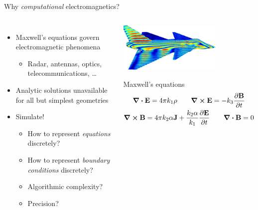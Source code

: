 \documentclass[aspectratio=169, usenames, dvipsnames]{beamer}
\begin{document}
\begin{frame}{Why \emph{computational} electromagnetics?}
  \begin{columns}
      \begin{itemize}
        \item Maxwell's equations govern electromagnetic phenomena
          \begin{itemize}
            \item Radar, antennas, optics, telecommunications, \ldots
          \end{itemize}
        \item Analytic solutions unavailable for all but simplest geometries
        \item Simulate!
          \begin{itemize}
            \item How to represent \emph{equations} discretely?
            \item How to represent \emph{boundary conditions} discretely?
            \item Algorithmic complexity?
            \item Precision?
          \end{itemize}
      \end{itemize}
    \begin{center}
      \includegraphics[width=0.7\textwidth]{figures/aircraft}
      \vspace{0.3cm}
      \begin{block}{Maxwell's equations}
        \begin{gather*}
          \div \vb{E} = 4 \pi k_1 \rho \qquad \curl \vb{E} = -k_3 \pdv{\vb{B}}{t} \\
          \curl \vb{B} = 4 \pi k_2 \alpha \vb{J} + \frac{k_2 \alpha}{k_1} \pdv{\vb{E}}{t} \qquad \div \vb{B} = 0
        \end{gather*}
      \end{block}
    \end{center}
  \end{columns}
\end{frame}
\end{document}
